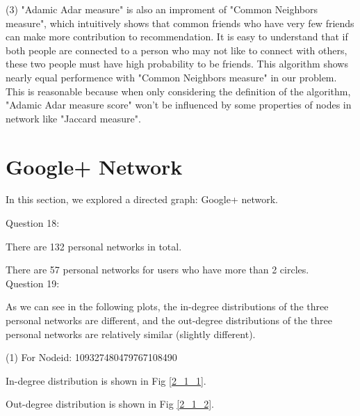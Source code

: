 \documentclass[11pt]{article}
\begin{document}
(3) "Adamic Adar measure" is also an improment of "Common Neighbors measure", which intuitively shows that common friends who have very few friends can make more contribution to recommendation. It is easy to understand that if both people are connected to a person who may not like to connect with others, these two people must have high probability to be friends. This algorithm shows nearly equal performence with "Common Neighbors measure" in our problem. This is reasonable because when only considering the definition of the algorithm, "Adamic Adar measure score"
won't be influenced by some properties of nodes in network like "Jaccard measure".


\section{Google+ Network}

In this section, we explored a directed graph: Google+ network.

Question 18:

There are 132 personal networks in total.

There are 57 personal networks for users who have more than 2 circles.\\

Question 19:

As we can see in the following plots, the in-degree distributions of the three personal networks are different, and the out-degree distributions of the three personal networks are relatively similar (slightly different).

(1) For Nodeid: 109327480479767108490

In-degree distribution is shown in Fig \ref{2_1_1}.

Out-degree distribution is shown in Fig \ref{2_1_2}.
\end{document}
